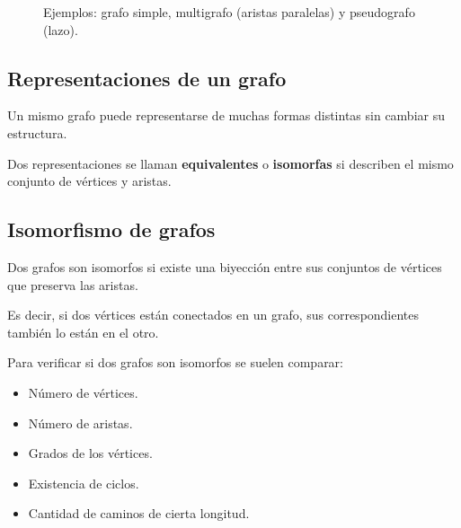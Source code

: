 \documentclass[12pt]{article}
\theoremstyle{plain}
\theoremstyle{definition}
\theoremstyle{remark}
\begin{document}
\begin{figure}[htbp]
\centering
{}
\caption{Ejemplos: grafo simple, multigrafo (aristas paralelas) y pseudografo (lazo).}
\end{figure}

\subsection*{Representaciones de un grafo}

Un mismo grafo puede representarse de muchas formas distintas sin cambiar su estructura.

Dos representaciones se llaman \textbf{equivalentes} o \textbf{isomorfas} si describen el mismo conjunto de vértices y aristas.

\subsection*{Isomorfismo de grafos}

Dos grafos son isomorfos si existe una biyección entre sus conjuntos de vértices que preserva las aristas.

Es decir, si dos vértices están conectados en un grafo, sus correspondientes también lo están en el otro.

Para verificar si dos grafos son isomorfos se suelen comparar:

\begin{itemize}
    \item Número de vértices.
    \item Número de aristas.
    \item Grados de los vértices.
    \item Existencia de ciclos.
    \item Cantidad de caminos de cierta longitud.
\end{itemize}
\end{document}
